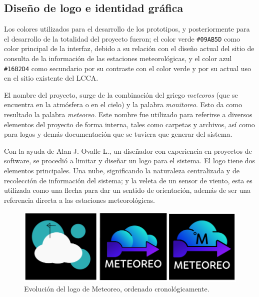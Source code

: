 \pagebreak

\subsection{Diseño de logo e identidad gráfica}

Los colores utilizados para el desarrollo de los prototipos, y posteriormente para el desarrollo de la totalidad del proyecto fueron; el color verde \texttt{\#09AB5D} como color principal de la interfaz, debido a su relación con el diseño actual del sitio de consulta de la información de las estaciones meteorológicas, y el color azul \texttt{\#16B2D4} como secundario por su contraste con el color verde y por su actual uso en el sitio existente del LCCA.

El nombre del proyecto, surge de la combinación del griego \textit{meteoros} (que se encuentra en la atmósfera o en el cielo) y la palabra \textit{monitoreo}. Esto da como resultado la palabra \textit{meteoreo}. Este nombre fue utilizado para referirse a diversos elementos del proyecto de forma interna, tales como carpetas y archivos, así como para logos y demás documentación que se tuviera que generar del sistema.

Con la ayuda de Alan J. Ovalle L., un diseñador con experiencia en proyectos de software, se procedió a limitar y diseñar un logo para el sistema. El logo tiene dos elementos principales. Una nube, significando la naturaleza centralizada y de recolección de información del sistema; y la veleta de un sensor de viento, esta es utilizada como una flecha para dar un sentido de orientación, además de ser una referencia directa a las estaciones meteorológicas.

\begin{figure}[!ht]
	\centering
	\includegraphics[width=1\linewidth]{images/logos/evolution.png}
	\caption{Evolución del logo de Meteoreo, ordenado cronológicamente.}
	\label{fig:logo_evolution}
\end{figure}

